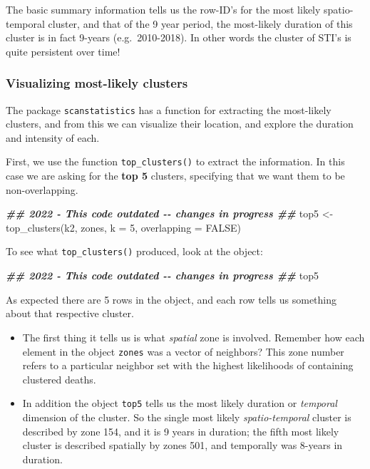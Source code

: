 \documentclass[
]{book}
\newenvironment{Shaded}{\begin{snugshade}}{\end{snugshade}}
\newcommand{\AttributeTok}[1]{\textcolor[rgb]{0.77,0.63,0.00}{#1}}
\newcommand{\ConstantTok}[1]{\textcolor[rgb]{0.00,0.00,0.00}{#1}}
\newcommand{\DecValTok}[1]{\textcolor[rgb]{0.00,0.00,0.81}{#1}}
\newcommand{\DocumentationTok}[1]{\textcolor[rgb]{0.56,0.35,0.01}{\textbf{\textit{#1}}}}
\newcommand{\FunctionTok}[1]{\textcolor[rgb]{0.00,0.00,0.00}{#1}}
\newcommand{\NormalTok}[1]{#1}
\newcommand{\OtherTok}[1]{\textcolor[rgb]{0.56,0.35,0.01}{#1}}
\providecommand{\tightlist}{%
  \setlength{\itemsep}{0pt}\setlength{\parskip}{0pt}}
\begin{document}
The basic summary information tells us the row-ID's for the most likely spatio-temporal cluster, and that of the 9 year period, the most-likely duration of this cluster is in fact 9-years (e.g.~2010-2018). In other words the cluster of STI's is quite persistent over time!

\hypertarget{visualizing-most-likely-clusters}{%
\subsubsection{Visualizing most-likely clusters}\label{visualizing-most-likely-clusters}}

The package \texttt{scanstatistics} has a function for extracting the most-likely clusters, and from this we can visualize their location, and explore the duration and intensity of each.

First, we use the function \texttt{top\_clusters()} to extract the information. In this case we are asking for the \textbf{top 5} clusters, specifying that we want them to be non-overlapping.

\begin{Shaded}
\begin{Highlighting}[]
\DocumentationTok{\#\# 2022 {-} This code outdated {-}{-} changes in progress \#\#}
\NormalTok{top5 }\OtherTok{\textless{}{-}} \FunctionTok{top\_clusters}\NormalTok{(k2, zones, }\AttributeTok{k =} \DecValTok{5}\NormalTok{, }\AttributeTok{overlapping =} \ConstantTok{FALSE}\NormalTok{)}
\end{Highlighting}
\end{Shaded}

To see what \texttt{top\_clusters()} produced, look at the object:

\begin{Shaded}
\begin{Highlighting}[]
\DocumentationTok{\#\# 2022 {-} This code outdated {-}{-} changes in progress \#\#}
\NormalTok{top5}
\end{Highlighting}
\end{Shaded}

As expected there are 5 rows in the object, and each row tells us something about that respective cluster.

\begin{itemize}
\tightlist
\item
  The first thing it tells us is what \emph{spatial} zone is involved. Remember how each element in the object \texttt{zones} was a vector of neighbors? This zone number refers to a particular neighbor set with the highest likelihoods of containing clustered deaths.\\
\item
  In addition the object \texttt{top5} tells us the most likely duration or \emph{temporal} dimension of the cluster. So the single most likely \emph{spatio-temporal} cluster is described by zone 154, and it is 9 years in duration; the fifth most likely cluster is described spatially by zones 501, and temporally was 8-years in duration.
\end{itemize}
\end{document}
